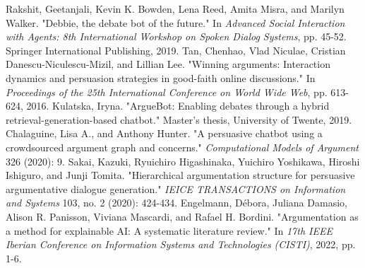 \documentclass[conference]{IEEEtran}
\begin{document}
\begin{thebibliography}{00}
 Rakshit, Geetanjali, Kevin K. Bowden, Lena Reed, Amita Misra, and Marilyn Walker. "Debbie, the debate bot of the future." In \textit{Advanced Social Interaction with Agents: 8th International Workshop on Spoken Dialog Systems}, pp. 45-52. Springer International Publishing, 2019.
 Tan, Chenhao, Vlad Niculae, Cristian Danescu-Niculescu-Mizil, and Lillian Lee. "Winning arguments: Interaction dynamics and persuasion strategies in good-faith online discussions." In \textit{Proceedings of the 25th International Conference on World Wide Web}, pp. 613-624, 2016.
 Kulatska, Iryna. "ArgueBot: Enabling debates through a hybrid retrieval-generation-based chatbot." Master's thesis, University of Twente, 2019.
 Chalaguine, Lisa A., and Anthony Hunter. "A persuasive chatbot using a crowdsourced argument graph and concerns." \textit{Computational Models of Argument} 326 (2020): 9.
 Sakai, Kazuki, Ryuichiro Higashinaka, Yuichiro Yoshikawa, Hiroshi Ishiguro, and Junji Tomita. "Hierarchical argumentation structure for persuasive argumentative dialogue generation." \textit{IEICE TRANSACTIONS on Information and Systems} 103, no. 2 (2020): 424-434.
 Engelmann, Débora, Juliana Damasio, Alison R. Panisson, Viviana Mascardi, and Rafael H. Bordini. "Argumentation as a method for explainable AI: A systematic literature review." In \textit{17th IEEE Iberian Conference on Information Systems and Technologies (CISTI)}, 2022, pp. 1-6.
\end{thebibliography}
\end{document}
